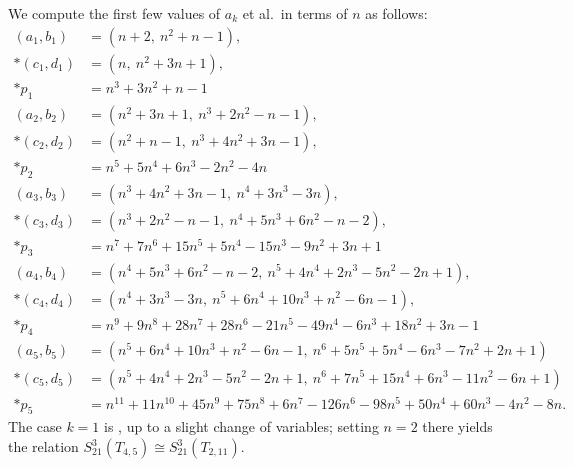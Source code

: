 \documentclass[11pt]{amsart}
\numberwithin{equation}{section}
\numberwithin{theorem}{section}
\theoremstyle{definition}
\begin{document}
We compute the first few values of $a_k$ et al.~in terms of $n$ as follows:
\begingroup
\allowdisplaybreaks
\begin{align*}
(a_1,b_1) &= (n+2,\ n^2+n-1), \\*
(c_1,d_1) &= (n,\ n^2+3n+1), \\*
p_1 &= n^3+3n^2+n-1 \\[1em]
%
(a_2,b_2) &= (n^2+3n+1,\ n^3+2n^2-n-1), \\*
(c_2,d_2) &= (n^2+n-1,\ n^3+4n^2+3n-1), \\*
p_2 &= n^5+5n^4+6n^3-2n^2-4n \\[1em]
%
(a_3,b_3) &= (n^3+4n^2+3n-1,\ n^4+3n^3-3n), \\*
(c_3,d_3) &= (n^3+2n^2-n-1,\ n^4+5n^3+6n^2-n-2), \\*
p_3 &= n^7 + 7n^6 + 15n^5 + 5n^4 - 15n^3 - 9n^2 + 3n + 1 \\[1em]
%
(a_4,b_4) &= (n^4+5n^3+6n^2-n-2,\ n^5 + 4n^4 + 2n^3 - 5n^2 - 2n + 1), \\*
(c_4,d_4) &= (n^4+3n^3-3n,\ n^5 + 6n^4 + 10n^3 + n^2 - 6n - 1), \\*
p_4 &= n^9 + 9n^8 + 28n^7 + 28n^6 - 21n^5 - 49n^4 - 6n^3 + 18n^2 + 3n - 1 \\[1em]
%
(a_5,b_5) &= (n^5 + 6n^4 + 10n^3 + n^2 - 6n - 1,\ n^6 + 5n^5 + 5n^4 - 6n^3 - 7n^2 + 2n + 1) \\*
(c_5,d_5) &= (n^5 + 4n^4 + 2n^3 - 5n^2 - 2n + 1,\ n^6 + 7n^5 + 15n^4 + 6n^3 - 11n^2 - 6n + 1) \\*
p_5 &= n^{11} + 11n^{10} + 45n^9 + 75n^8 + 6n^7 - 126n^6 - 98n^5 + 50n^4 + 60n^3 - 4n^2 - 8n .
\end{align*}
\endgroup
The case $k=1$ is \cite[Example~1.1]{ni-zhang-torus-1}, up to a slight change of variables; setting $n=2$ there yields the relation $S^3_{21}(T_{4,5}) \cong S^3_{21}(T_{2,11})$.



\end{document}
